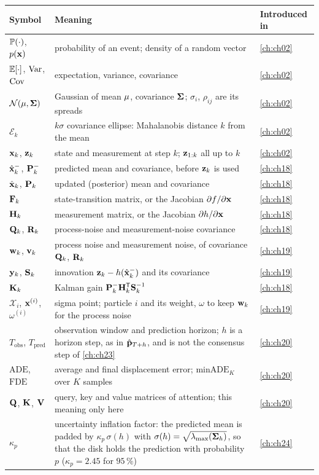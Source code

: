 {\small\renewcommand{\arraystretch}{1.0}%
\noindent\begin{tabularx}{\textwidth}{@{}lYl@{}}
\toprule
\textbf{Symbol} & \textbf{Meaning} & \textbf{Introduced in}\\
\midrule
$\mathbb{P}(\cdot)$, $p(\mathbf{x})$ & probability of an event; density of a random vector & \cref{ch:ch02}\\
$\mathbb{E}[\cdot]$, $\operatorname{Var}$, $\operatorname{Cov}$ & expectation, variance, covariance & \cref{ch:ch02}\\
$\mathcal{N}(\mathbf{\mu},\mathbf{\Sigma})$ & Gaussian of mean $\mathbf{\mu}$, covariance $\mathbf{\Sigma}$; $\sigma_i$, $\rho_{ij}$ are its spreads & \cref{ch:ch02}\\
$\mathcal{E}_k$ & $k\sigma$ covariance ellipse: Mahalanobis distance $k$ from the mean & \cref{ch:ch02}\\
$\mathbf{x}_k$, $\mathbf{z}_k$ & state and measurement at step $k$; $\mathbf{z}_{1:k}$ all up to $k$ & \cref{ch:ch02}\\
$\hat{\mathbf{x}}_k^-$, $\mathbf{P}_k^-$ & predicted mean and covariance, before $\mathbf{z}_k$ is used & \cref{ch:ch18}\\
$\hat{\mathbf{x}}_k$, $\mathbf{P}_k$ & updated (posterior) mean and covariance & \cref{ch:ch18}\\
$\mathbf{F}_k$ & state-transition matrix, or the Jacobian $\partial f/\partial\mathbf{x}$ & \cref{ch:ch18}\\
$\mathbf{H}_k$ & measurement matrix, or the Jacobian $\partial h/\partial\mathbf{x}$ & \cref{ch:ch18}\\
$\mathbf{Q}_k$, $\mathbf{R}_k$ & process-noise and measurement-noise covariance & \cref{ch:ch18}\\
$\mathbf{w}_k$, $\mathbf{v}_k$ & process noise and measurement noise, of covariance $\mathbf{Q}_k$, $\mathbf{R}_k$ & \cref{ch:ch19}\\
$\mathbf{y}_k$, $\mathbf{S}_k$ & innovation $\mathbf{z}_k-h(\hat{\mathbf{x}}_k^-)$ and its covariance & \cref{ch:ch19}\\
$\mathbf{K}_k$ & Kalman gain $\mathbf{P}_k^-\mathbf{H}_k^{\mathsf{T}}\mathbf{S}_k^{-1}$ & \cref{ch:ch18}\\
$\mathcal{X}_i$, $\mathbf{x}^{(i)}$, $\omega^{(i)}$ & sigma point; particle $i$ and its weight, $\omega$ to keep $\mathbf{w}_k$ for the process noise & \cref{ch:ch19}\\
$T_{\mathrm{obs}}$, $T_{\mathrm{pred}}$ & observation window and prediction horizon; $h$ is a horizon step, as in $\hat{\mathbf{p}}_{T+h}$, and is not the consensus step of \cref{ch:ch23} & \cref{ch:ch20}\\
$\mathrm{ADE}$, $\mathrm{FDE}$ & average and final displacement error; $\mathrm{minADE}_K$ over $K$ samples & \cref{ch:ch20}\\
$\mathbf{Q}$, $\mathbf{K}$, $\mathbf{V}$ & query, key and value matrices of attention; this meaning only here & \cref{ch:ch20}\\
$\kappa_p$ & uncertainty inflation factor: the predicted mean is padded by $\kappa_p\,\sigma(h)$ with $\sigma(h)=\sqrt{\lambda_{\max}(\mathbf{\Sigma}_h)}$, so that the disk holds the prediction with probability $p$ ($\kappa_p=2.45$ for $95\,\%$) & \cref{ch:ch24}\\
\bottomrule
\end{tabularx}\par}

